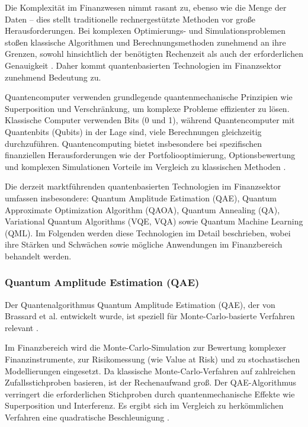 Die Komplexität im Finanzwesen nimmt rasant zu, ebenso wie die Menge der Daten – dies stellt traditionelle rechnergestützte Methoden vor große Herausforderungen. Bei komplexen Optimierungs- und Simulationsproblemen stoßen klassische Algorithmen und Berechnungsmethoden zunehmend an ihre Grenzen, sowohl hinsichtlich der benötigten Rechenzeit als auch der erforderlichen Genauigkeit \cite{plos2024,bouland2020}. Daher kommt quantenbasierten Technologien im Finanzsektor zunehmend Bedeutung zu.

Quantencomputer verwenden grundlegende quantenmechanische Prinzipien wie Superposition und Verschränkung, um komplexe Probleme effizienter zu lösen. Klassische Computer verwenden Bits (0 und 1), während Quantencomputer mit Quantenbits (Qubits) in der Lage sind, viele Berechnungen gleichzeitig durchzuführen. Quantencomputing bietet insbesondere bei spezifischen finanziellen Herausforderungen wie der Portfoliooptimierung, Optionsbewertung und komplexen Simulationen Vorteile im Vergleich zu klassischen Methoden \cite{orus2019,bouland2020,martin2022}.

Die derzeit marktführenden quantenbasierten Technologien im Finanzsektor umfassen insbesondere:
Quantum Amplitude Estimation (QAE), Quantum Approximate Optimization Algorithm (QAOA), Quantum Annealing (QA), Variational Quantum Algorithms (VQE, VQA) sowie Quantum Machine Learning (QML). Im Folgenden werden diese Technologien im Detail beschrieben, wobei ihre Stärken und Schwächen sowie mögliche Anwendungen im Finanzbereich behandelt werden.

\subsubsection{Quantum Amplitude Estimation (QAE)}

Der Quantenalgorithmus Quantum Amplitude Estimation (QAE), der von Brassard et al. entwickelt wurde, ist speziell für Monte-Carlo-basierte Verfahren relevant \cite{quantumjournal2020,rebentrost2018}.

Im Finanzbereich wird die Monte-Carlo-Simulation zur Bewertung komplexer Finanzinstrumente, zur Risikomessung (wie Value at Risk) und zu stochastischen Modellierungen eingesetzt. Da klassische Monte-Carlo-Verfahren auf zahlreichen Zufallsstichproben basieren, ist der Rechenaufwand groß. Der QAE-Algorithmus verringert die erforderlichen Stichproben durch quantenmechanische Effekte wie Superposition und Interferenz. Es ergibt sich im Vergleich zu herkömmlichen Verfahren eine quadratische Beschleunigung \cite{quantumjournal2020,rebentrost2018,martin2022}.

